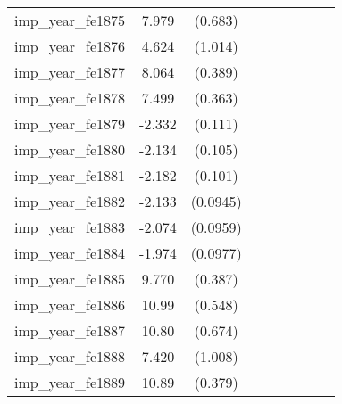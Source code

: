 {\begin{tabular}{l*{4}{cc}}
imp\_year\_fe1875&    7.979\sym{***}&  (0.683)&                  &         &                  &         &                  &         \\
imp\_year\_fe1876&    4.624\sym{***}&  (1.014)&                  &         &                  &         &                  &         \\
imp\_year\_fe1877&    8.064\sym{***}&  (0.389)&                  &         &                  &         &                  &         \\
imp\_year\_fe1878&    7.499\sym{***}&  (0.363)&                  &         &                  &         &                  &         \\
imp\_year\_fe1879&   -2.332\sym{***}&  (0.111)&                  &         &                  &         &                  &         \\
imp\_year\_fe1880&   -2.134\sym{***}&  (0.105)&                  &         &                  &         &                  &         \\
imp\_year\_fe1881&   -2.182\sym{***}&  (0.101)&                  &         &                  &         &                  &         \\
imp\_year\_fe1882&   -2.133\sym{***}& (0.0945)&                  &         &                  &         &                  &         \\
imp\_year\_fe1883&   -2.074\sym{***}& (0.0959)&                  &         &                  &         &                  &         \\
imp\_year\_fe1884&   -1.974\sym{***}& (0.0977)&                  &         &                  &         &                  &         \\
imp\_year\_fe1885&    9.770\sym{***}&  (0.387)&                  &         &                  &         &                  &         \\
imp\_year\_fe1886&    10.99\sym{***}&  (0.548)&                  &         &                  &         &                  &         \\
imp\_year\_fe1887&    10.80\sym{***}&  (0.674)&                  &         &                  &         &                  &         \\
imp\_year\_fe1888&    7.420\sym{***}&  (1.008)&                  &         &                  &         &                  &         \\
imp\_year\_fe1889&    10.89\sym{***}&  (0.379)&                  &         &                  &         &                  &         \\

\end{tabular}}
